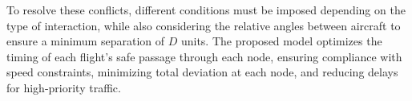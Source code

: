 \documentclass[../../thesis.tex]{subfiles}
\begin{document}
To resolve these conflicts, different conditions must be imposed depending on the type of interaction, while also considering the relative angles between aircraft to ensure a minimum separation of $D$ units.  
The proposed model optimizes the timing of each flight’s safe passage through each node, ensuring compliance with speed constraints, minimizing total deviation at each node, and reducing delays for high-priority traffic.%
\end{document}
